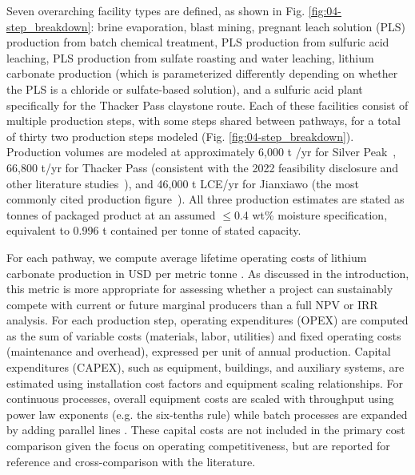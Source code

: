\documentclass{article}
\renewcommand\_{\textunderscore\allowbreak}
\begin{document}
Seven overarching facility types are defined, as shown in Fig. \ref{fig:04-step_breakdown}: brine evaporation, blast mining, pregnant leach solution (PLS) production from batch chemical treatment, PLS production from sulfuric acid leaching, PLS production from sulfate roasting and water leaching, lithium carbonate production (which is parameterized differently depending on whether the PLS is a chloride or sulfate-based solution), and a sulfuric acid plant specifically for the Thacker Pass claystone route. Each of these facilities consist of multiple production steps, with some steps shared between pathways, for a total of thirty two production steps modeled (Fig. \ref{fig:04-step_breakdown}). Production volumes are modeled at approximately 6,000 t /yr for Silver Peak~\cite{srkconsultingSECTechnicalReport2023a}, 66,800 t/yr for Thacker Pass (consistent with the 2022 feasibility disclosure \cite{rothFeasibilityStudyNational2022} and other literature studies~\cite{wesselkaemperOptimizationProcessingCosts2025, royLithiumClayAssessing2024}), and 46,000 t LCE/yr for Jianxiawo (the most commonly cited production figure~\cite{flemingLongrunAvailabilityMineral2024, andrezejewskiResourcesEnergyQuarterly2025}). All three production estimates are stated as tonnes of packaged product at an assumed $\leq$0.4 wt\% moisture specification, equivalent to 0.996 t contained  per tonne of stated capacity.
 
For each pathway, we compute average lifetime operating costs of lithium carbonate production in USD per metric tonne . As discussed in the introduction, this metric is more appropriate for assessing whether a project can sustainably compete with current or future marginal producers than a full NPV or IRR analysis. For each production step, operating expenditures (OPEX) are computed as the sum of variable costs (materials, labor, utilities) and fixed operating costs (maintenance and overhead), expressed per unit of annual  production. Capital expenditures (CAPEX), such as equipment, buildings, and auxiliary systems, are estimated using installation cost factors and equipment scaling relationships. For continuous processes, overall equipment costs are scaled with throughput using power law exponents (e.g. the six-tenths rule) while batch processes are expanded by adding parallel lines \cite{petersPlantDesignEconomics1991, ausimmMonograph27Cost, ulrichGuideChemicalEngineering1984}. These capital costs are not included in the primary cost comparison given the focus on operating competitiveness, but are reported for reference and cross-comparison with the literature. 
\end{document}
